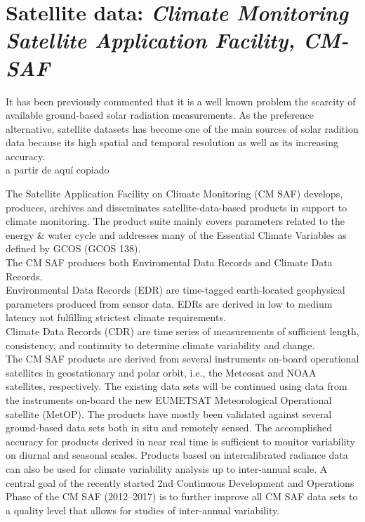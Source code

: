   
\section{Satellite data: \textit{Climate Monitoring Satellite Application Facility, CM-SAF}}

It has been previously commented that it is a well known problem the scarcity of available ground-based solar radiation measurements. As the preference alternative, satellite datasets has become one of the main sources of solar radition data because its high spatial and temporal resolution as well as its increasing accuracy.\\

{\color{red}a partir de aquí copiado}

The Satellite Application Facility on Climate Monitoring (CM SAF) develops, produces, archives and disseminates satellite-data-based products in support to climate monitoring. The product suite mainly covers parameters related to the energy & water cycle and addresses many of the Essential Climate Variables as defined by GCOS (GCOS 138).\\

The CM SAF produces both Enviromental Data Records and Climate Data Records.\\

Environmental Data Records (EDR) are time-tagged earth-located geophysical parameters produced from sensor data. EDRs are derived in low to medium latency not fulfilling strictest climate requirements.\\

Climate Data Records (CDR) are time series of measurements of sufficient length, consistency, and continuity to determine climate variability and change.\\

The CM SAF products are derived from several instruments on-board operational satellites in geostationary and polar orbit, i.e., the Meteosat and NOAA satellites, respectively. The existing data sets will be continued using data from the instruments on-board the new EUMETSAT Meteorological Operational satellite (MetOP). The products have mostly been validated against several ground-based data sets both in situ and remotely sensed. The accomplished accuracy for products derived in near real time is sufficient to monitor variability on diurnal and seasonal scales. Products based on intercalibrated radiance data can also be used for climate variability analysis up to inter-annual scale. A central goal of the recently started 2nd Continuous Development and Operations Phase of the CM SAF (2012–2017) is to further improve all CM SAF data sets to a quality level that allows for studies of inter-annual variability.
